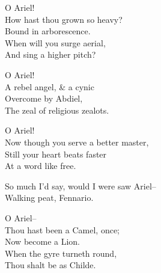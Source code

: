 O Ariel! \\
How hast thou grown so heavy? \\
Bound in arborescence. \\
When will you surge aerial, \\
And sing a higher pitch? 

O Ariel! \\
A rebel angel, \& a cynic \\
Overcome by Abdiel, \\
The zeal of religious zealots.

O Ariel! \\
Now though you serve a better master, \\
Still your heart beats faster \\
At a word like free.

So much I'd say, would I were saw Ariel-- \\
Walking peat, Fennario. %

O Ariel-- \\
Thou hast been a Camel, once; \\
Now become a Lion. \\
When the gyre turneth round, \\
Thou shalt be as Childe.